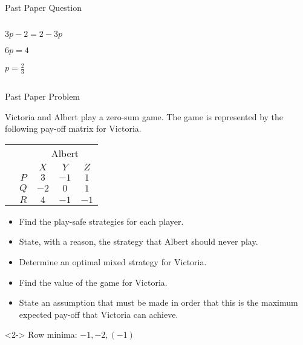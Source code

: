 \documentclass[8pt]{beamer}
\begin{document}
\begin{frame}[shrink]{Past Paper Question}
\begin{columns}
\begin{column}{.5\linewidth}
\begin{solution}

				  $3p-2=2-3p$

 $6p=4$

  $p=\frac{2}{3}$
  \end{solution}
	\end{column}
	\end{columns}
\end{frame}

\begin{frame}[shrink=20]{Past Paper Problem}
\begin{problem}
	Victoria and Albert play a zero-sum game. The game is represented by the following pay-off matrix for Victoria.
	\begin{center}
	\colorbox{cc}{
		\setlength\arrayrulewidth{0.5mm}
		\begin{tabular}{cc|ccc}
			\multicolumn{2}{c}{} & \multicolumn{3}{c}{Albert}\\
			\multicolumn{1}{c}{} &  & $X$  & $Y$ & $Z$ \\ \hline 
			\raisebox{0cm}{\multirow{3}*{\rotatebox{90}{Victoria}}}  & $P$ & $3$ & $-1$ & $1$ \\
			& $Q$ & $-2$ & $0$ & $1$ \\
			& $R$ & $4$ & $-1$ & $-1$ \\
	\end{tabular}}
\end{center}
\begin{itemize}
	\item Find the play-safe strategies for each player.
	\item State, with a reason, the strategy that Albert should never play.
	\item Determine an optimal mixed strategy for Victoria.
	\item Find the value of the game for Victoria.
	\item State an assumption that must be made in order that this is the maximum expected pay-off that Victoria can achieve.
\end{itemize}
\end{problem}
\begin{solution}<2->
	Row minima: $-1,-2,(-1)$
	

\end{solution}
\end{frame}
\end{document}
